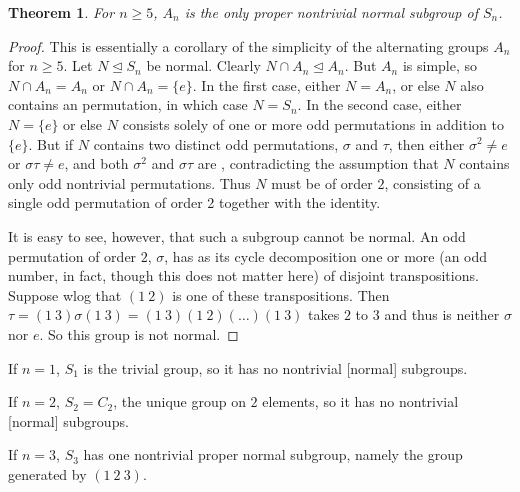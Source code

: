 \documentclass[12pt]{article}
\newtheorem{thm}{Theorem}
\begin{document}

\begin{thm} For $n\geq 5$, $A_n$ is the only proper nontrivial normal subgroup of $S_n$.
\end{thm}

\begin{proof} This is essentially a corollary of the simplicity of the alternating groups $A_n$ for $n\geq 5$. Let $N\unlhd S_n$ be normal. Clearly $N\cap A_n\unlhd A_n$. But $A_n$ is simple, so $N\cap A_n=A_n$ or $N\cap A_n=\{e\}$. In the first case, either $N=A_n$, or else $N$ also contains an  permutation, in which case $N=S_n$. In the second case, either $N=\{e\}$ or else $N$ consists solely of one or more odd permutations in addition to $\{e\}$. But if $N$ contains two distinct odd permutations, $\sigma$ and $\tau$, then either $\sigma^2\neq e$ or $\sigma\tau\neq e$, and both $\sigma^2$ and $\sigma\tau$ are , contradicting the assumption that $N$ contains only odd nontrivial permutations. Thus $N$ must be of order $2$, consisting of a single odd permutation of order 2 together with the identity.

It is easy to see, however, that such a subgroup cannot be normal. An odd permutation of order $2$, $\sigma$, has as its cycle decomposition one or more (an odd number, in fact, though this does not matter here) of disjoint transpositions. Suppose wlog that $(1~2)$ is one of these transpositions. Then $\tau=(1~3)\sigma(1~3)=(1~3)(1~2)(\ldots)(1~3)$ takes $2$ to $3$ and thus is neither $\sigma$ nor $e$. So this group is not normal.
\end{proof}

If $n=1$, $S_1$ is the trivial group, so it has no nontrivial [normal] subgroups.

If $n=2$, $S_2=C_2$, the unique group on $2$ elements, so it has no nontrivial [normal] subgroups.

If $n=3$, $S_3$ has one nontrivial proper normal subgroup, namely the group generated by $(1~2~3)$.
\end{document}
